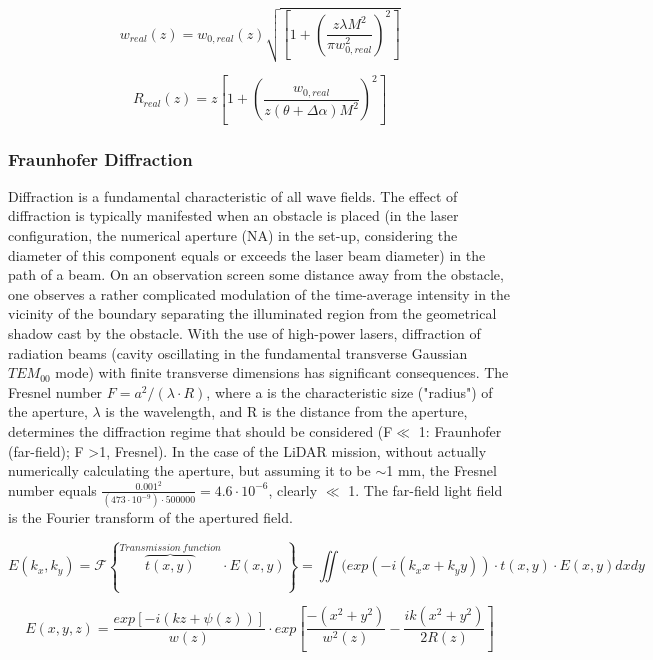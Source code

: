 \begin{equation}
w_{real}(z)=w_{0,real}(z)\sqrt{\left[1 + \left(\frac{z\lambda M^{2}}{\pi w_{0,real}^{2}}\right)^{2}\right]}
\end{equation}

\begin{equation}
R_{real}(z)=z\left[1 + \left(\frac{w_{0,real}}{z(\theta+\Delta \alpha) M^{2}}\right)^{2}\right]
\end{equation}

\subsubsection{Fraunhofer Diffraction} 
Diffraction is a fundamental characteristic of all wave fields. The effect of diffraction is typically manifested when an obstacle is placed (in the \acs{laser} configuration, the numerical aperture (NA) in the set-up, considering the diameter of this component equals or exceeds the \acs{laser} beam diameter) in the path of a beam.  On an observation screen some distance away from the obstacle, one observes a rather complicated modulation of the time-average intensity in the vicinity of the boundary separating the illuminated region from the geometrical shadow cast by the obstacle. With the use of high-power lasers, diffraction of radiation beams (cavity oscillating in the fundamental transverse Gaussian $TEM_{00}$ mode) with finite transverse dimensions has significant consequences. The Fresnel number $F = a^{2}/(\lambda \cdot R)$, where a is the characteristic size ("radius") of the aperture,  $\lambda$ is the wavelength, and R is the distance from the aperture, determines the diffraction regime that should be considered (F$\ll$ 1: Fraunhofer (far-field); F \textgreater 1, Fresnel). In the case of the \acs{LiDAR} mission, without actually numerically calculating the aperture, but assuming it to be $\sim$1 mm, the Fresnel number equals $\frac{0.001^{2}}{(473\cdot10^{-9})\cdot500000}=4.6\cdot10^{-6}$, clearly $\ll$ 1. The far-field light field is the Fourier transform of the apertured field.
	
\begin{equation} 
E(k_{x},k_{y}) = \mathcal{F}\left\{{\overbrace{t(x,y)}^{Transmission\  function}\cdot E(x,y)}\right\} = \iint(exp(-i(k_{x} x + k_{y}y))\cdot t(x,y)\cdot E(x,y)dxdy 
\end{equation}\cite{fourieroptics1} 

\begin{equation}
E(x,y,z) = \frac{exp\left[-i(kz + \psi(z))\right]}{w(z)}\cdot exp\left[\frac{-(x^{2}+y^{2})}{w^{2}(z)}-\frac{ik(x^{2}+y^{2})}{2R(z)}\right]
\end{equation}

